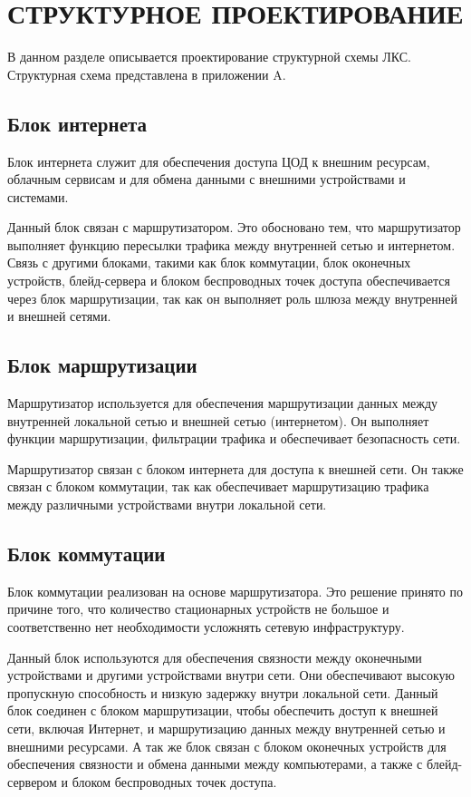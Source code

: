 \section{СТРУКТУРНОЕ ПРОЕКТИРОВАНИЕ}
\label{sec:sys}

В данном разделе описывается проектирование структурной схемы ЛКС. Структурная схема представлена в приложении A.

\subsection{Блок интернета}

Блок интернета служит для обеспечения доступа ЦОД к внешним ресурсам, облачным сервисам и для обмена данными с внешними устройствами и системами.

Данный блок связан с маршрутизатором. Это обосновано тем, что маршрутизатор выполняет функцию пересылки трафика между внутренней сетью и интернетом. Связь с другими блоками, такими как блок коммутации, блок оконечных устройств, блейд-сервера и блоком беспроводных точек доступа обеспечивается через блок маршрутизации, так как он выполняет роль шлюза между внутренней и внешней сетями.

\subsection{Блок маршрутизации}

Маршрутизатор используется для обеспечения маршрутизации данных между внутренней локальной сетью и внешней сетью (интернетом). Он выполняет функции маршрутизации, фильтрации трафика и обеспечивает безопасность сети.

Маршрутизатор связан с блоком интернета для доступа к внешней сети. Он также связан с блоком коммутации, так как обеспечивает маршрутизацию трафика между различными устройствами внутри локальной сети.

\subsection{Блок коммутации}

Блок коммутации реализован на основе маршрутизатора. Это решение принято по причине того, что количество стационарных устройств не большое и соответственно нет необходимости усложнять сетевую инфраструктуру.

Данный блок используются для обеспечения связности между оконечными устройствами и другими устройствами внутри сети. Они обеспечивают высокую пропускную способность и низкую задержку внутри локальной сети. Данный блок соединен с блоком маршрутизации, чтобы обеспечить доступ к внешней сети, включая Интернет, и маршрутизацию данных между внутренней сетью и внешними ресурсами. А так же блок связан с блоком оконечных устройств для обеспечения связности и обмена данными между компьютерами, а также с блейд-сервером и блоком беспроводных точек доступа.

